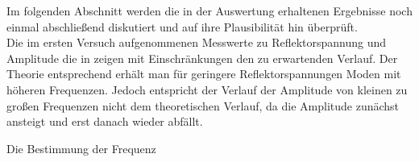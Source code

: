 
Im folgenden Abschnitt werden die in der Auswertung erhaltenen 
Ergebnisse noch einmal abschließend diskutiert und auf ihre Plausibilität hin 
überprüft.\\

Die im ersten Versuch aufgenommenen Messwerte zu Reflektorspannung und 
Amplitude die in zeigen mit Einschränkungen den zu erwartenden Verlauf.
Der Theorie entsprechend erhält man für geringere Reflektorspannungen 
Moden mit höheren Frequenzen. Jedoch entspricht der Verlauf der Amplitude von 
kleinen zu großen Frequenzen nicht dem theoretischen Verlauf, da die Amplitude 
zunächst ansteigt und erst danach wieder abfällt. 

Die Bestimmung der Frequenz 

  
